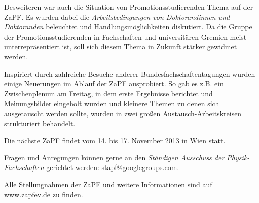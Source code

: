 \documentclass{scrartcl}
\begin{document}
Desweiteren war auch die Situation von Promotionsstudierenden Thema auf der ZaPF. Es wurden dabei die \emph{Arbeitsbedingungen von Doktorandinnen und Doktoranden} beleuchtet und Handlungsmöglichkeiten diskutiert. Da die Gruppe der Promotionsstudierenden in Fachschaften und universitären Gremien meist unterrepräsentiert ist, soll sich diesem Thema in Zukunft stärker gewidmet werden.

Inspiriert durch zahlreiche Besuche anderer Bundesfachschaftentagungen wurden einige Neuerungen im Ablauf der ZaPF ausprobiert. So gab es z.B. ein Zwischenplenum am Freitag, in dem erste Ergebnisse berichtet und Meinungsbilder eingeholt wurden und kleinere Themen zu denen sich ausgetauscht werden sollte, wurden in zwei großen Austausch-Arbeitskreisen strukturiert behandelt.

\vspace{0.5cm}
Die nächste ZaPF findet vom 14. bis 17. November 2013 in \href{http://zapf.fstph.at/}{Wien} statt.

Fragen und Anregungen können gerne an den \emph{Ständigen Ausschuss der Physik-Fachschaften} gerichtet werden:
\href{mailto:stapf@googlegroups.com}{stapf@googlegroups.com}. 

Alle Stellungnahmen der ZaPF und weitere Informationen sind auf \href{http://www.zapfev.de}{\url{www.zapfev.de}} zu finden.
 
\end{document}
